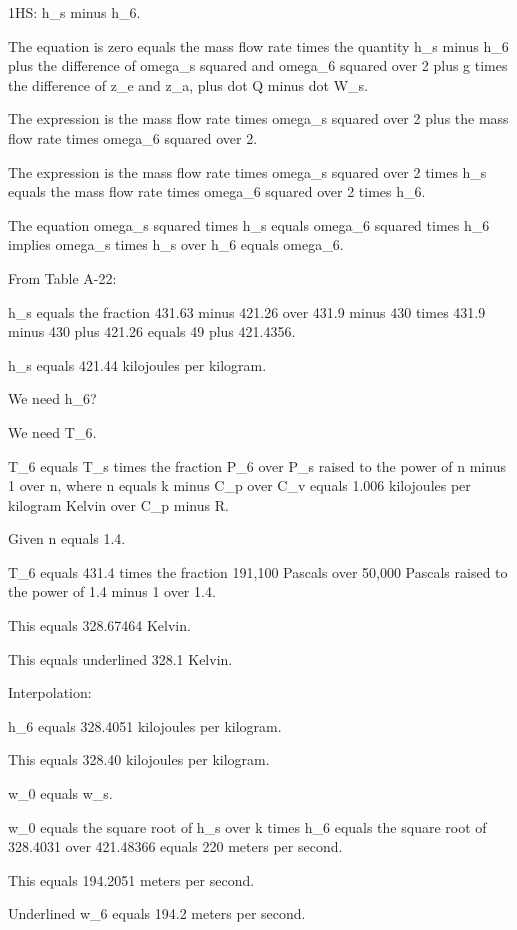 1HS: h_s minus h_6.

The equation is zero equals the mass flow rate times the quantity h_s minus h_6 plus the difference of omega_s squared and omega_6 squared over 2 plus g times the difference of z_e and z_a, plus dot Q minus dot W_s.

The expression is the mass flow rate times omega_s squared over 2 plus the mass flow rate times omega_6 squared over 2.

The expression is the mass flow rate times omega_s squared over 2 times h_s equals the mass flow rate times omega_6 squared over 2 times h_6.

The equation omega_s squared times h_s equals omega_6 squared times h_6 implies omega_s times h_s over h_6 equals omega_6.

From Table A-22:

h_s equals the fraction 431.63 minus 421.26 over 431.9 minus 430 times 431.9 minus 430 plus 421.26 equals 49 plus 421.4356.

h_s equals 421.44 kilojoules per kilogram.

We need h_6?

We need T_6.

T_6 equals T_s times the fraction P_6 over P_s raised to the power of n minus 1 over n, where n equals k minus C_p over C_v equals 1.006 kilojoules per kilogram Kelvin over C_p minus R.

Given n equals 1.4.

T_6 equals 431.4 times the fraction 191,100 Pascals over 50,000 Pascals raised to the power of 1.4 minus 1 over 1.4.

This equals 328.67464 Kelvin.

This equals underlined 328.1 Kelvin.

Interpolation:

h_6 equals 328.4051 kilojoules per kilogram.

This equals 328.40 kilojoules per kilogram.

w_0 equals w_s.

w_0 equals the square root of h_s over k times h_6 equals the square root of 328.4031 over 421.48366 equals 220 meters per second.

This equals 194.2051 meters per second.

Underlined w_6 equals 194.2 meters per second.